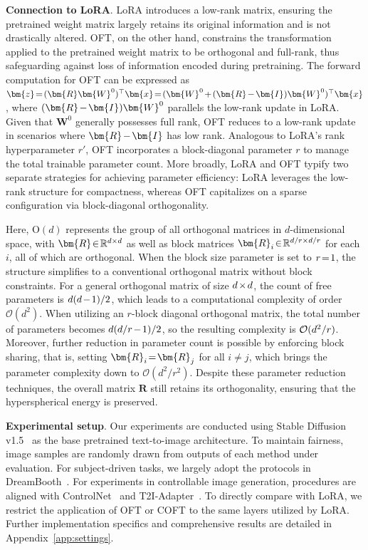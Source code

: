 \textbf{Connection to LoRA}. LoRA introduces a low-rank matrix, ensuring the pretrained weight matrix largely retains its original information and is not drastically altered. OFT, on the other hand, constrains the transformation applied to the pretrained weight matrix to be orthogonal and full-rank, thus safeguarding against loss of information encoded during pretraining. The forward computation for OFT can be expressed as $\thickmuskip=2mu \medmuskip=2mu \bm{z}=(\bm{R}\bm{W}^0)^\top\bm{x}=(\bm{W}^0+(\bm{R}-\bm{I})\bm{W}^0)^\top\bm{x}$, where $\thickmuskip=2mu \medmuskip=2mu (\bm{R}-\bm{I})\bm{W}^0$ parallels the low-rank update in LoRA. Given that $\bm{W}^0$ generally possesses full rank, OFT reduces to a low-rank update in scenarios where $\thickmuskip=2mu \medmuskip=2mu \bm{R}-\bm{I}$ has low rank. Analogous to LoRA's rank hyperparameter $r'$, OFT incorporates a block-diagonal parameter $r$ to manage the total trainable parameter count. More broadly, LoRA and OFT typify two separate strategies for achieving parameter efficiency: LoRA leverages the low-rank structure for compactness, whereas OFT capitalizes on a sparse configuration via block-diagonal orthogonality.

Here, $\text{O}(d)$ represents the group of all orthogonal matrices in $d$-dimensional space, with $\thickmuskip=2mu \medmuskip=2mu \bm{R}\in\mathbb{R}^{d\times d}$ as well as block matrices $\thickmuskip=2mu \medmuskip=2mu \bm{R}_i\in\mathbb{R}^{d/r\times d/r}$ for each $i$, all of which are orthogonal. When the block size parameter is set to $\thickmuskip=2mu \medmuskip=2mu r=1$, the structure simplifies to a conventional orthogonal matrix without block constraints. For a general orthogonal matrix of size $\thickmuskip=2mu \medmuskip=2mu d\times d$, the count of free parameters is $\thickmuskip=2mu \medmuskip=2mu d(d-1)/2$, which leads to a computational complexity of order $\mathcal{O}(d^2)$. When utilizing an $r$-block diagonal orthogonal matrix, the total number of parameters becomes $\thickmuskip=2mu \medmuskip=2mu d(d/r-1)/2$, so the resulting complexity is $\thickmuskip=2mu \medmuskip=2mu \mathcal{O}(d^2/r)$. Moreover, further reduction in parameter count is possible by enforcing block sharing, that is, setting $\thickmuskip=2mu \medmuskip=2mu\bm{R}_i=\bm{R}_j$ for all $i\neq j$, which brings the parameter complexity down to $\mathcal{O}(d^2/r^2)$. Despite these parameter reduction techniques, the overall matrix $\bm{R}$ still retains its orthogonality, ensuring that the hyperspherical energy is preserved.

\textbf{Experimental setup}. Our experiments are conducted using Stable Diffusion v1.5~\cite{rombach2022high} as the base pretrained text-to-image architecture. To maintain fairness, image samples are randomly drawn from outputs of each method under evaluation. For subject-driven tasks, we largely adopt the protocols in DreamBooth~\cite{ruiz2023dreambooth}. For experiments in controllable image generation, procedures are aligned with ControlNet~\cite{zhang2023adding} and T2I-Adapter~\cite{mou2023t2i}. To directly compare with LoRA, we restrict the application of OFT or COFT to the same layers utilized by LoRA. Further implementation specifics and comprehensive results are detailed in Appendix~\ref{app:settings}.